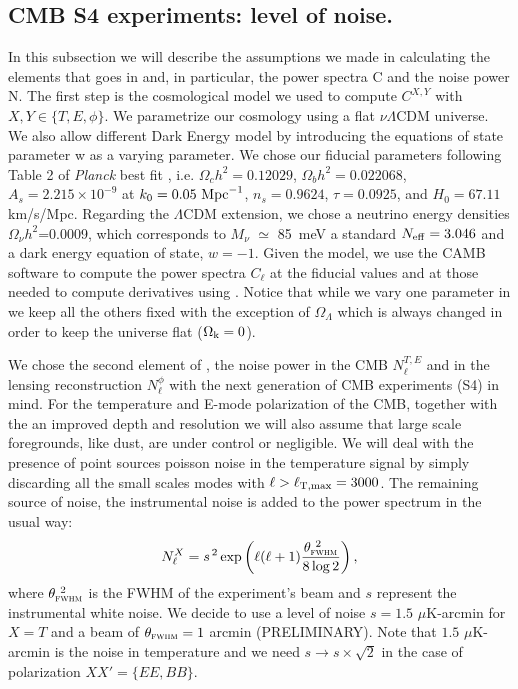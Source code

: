 \documentclass[aps,prd,preprint,groupedaddress]{revtex4-1}
\begin{document}
\subsection{CMB S4 experiments: level of noise.\label{subsec:cosmo-noise}}
In this subsection we will describe the assumptions we made in calculating the elements that goes in  and, in particular, the power spectra C and the noise power N.
The first step is the cosmological model we used to compute $C^{X,Y}$ with $X,Y \in \{T,E,\phi\}$.
We parametrize our cosmology using a flat $\nu \Lambda$CDM universe. We also allow different Dark Energy model by introducing the equations of state parameter w as a varying parameter.
We chose our fiducial parameters following Table 2 of \textit{Planck} best fit \cite{planck-collaboration:2014g}, i.e. $\Omega_c h^2 = 0.12029$, $\Omega_b h^2 = 0.022068$, $A_s = 2.215\times10^{-9}$ at $k_0 = 0.05\ {\rm Mpc}^{-1}$, $n_s = 0.9624$, $\tau = 0.0925$, and $H_0 = 67.11$ km/s/Mpc. Regarding the $\Lambda$CDM extension, we chose a neutrino energy densities $\Omega_{\nu} h^2$=0.0009, which corresponds to $M_{\nu}$ $\simeq$ 85\ meV a standard $N_{\rm eff}=3.046$ and a dark energy equation of state, $w=-1$.
Given the model, we use the CAMB software to compute the power spectra $C_{\ell}$ at the fiducial values and at those needed to compute derivatives using . Notice that while we vary one parameter in  we keep all the others fixed with the exception of $\Omega_{\Lambda}$ which is always changed in order to keep the universe flat ($\Omega_{\rm k} = 0$).

We chose the second element of , the noise power in the CMB $N_{\ell}^{T,E}$ and in the lensing reconstruction $N_{\ell}^{\phi}$ with the next generation of CMB experiments (S4) in mind.
For the temperature and E-mode polarization of the CMB, together with the an improved depth and resolution we will also assume that large scale foregrounds, like dust, are under control or negligible. We will deal with the presence of point sources poisson noise in the temperature signal by simply discarding all the small scales modes with $\ell>\ell_{\rm T,max}=3000$.
The remaining source of noise, the instrumental noise is added to the power spectrum in the usual way:
 \begin{equation}
 	\centering
		N^{X}_\ell = s^{\, 2} \exp \left(\ell(\ell+1) \frac{\theta^{\ 2}_{\textsc{fwhm}}}{8\log2}\right),
	\label{eq:beamnoise}
\end{equation}
where $\theta^{\ 2}_{\textsc{fwhm}}$ is the FWHM of the experiment's beam and $s$ represent the instrumental white noise.
We decide to use a level of noise $s = 1.5$ $\mu$K-arcmin for $X=T$ and a beam of $\theta_{\textsc{fwhm}}=1$ arcmin (PRELIMINARY).
Note that $1.5$ $\mu$K-arcmin is the noise in temperature and we need $s \rightarrow s\times \sqrt{2}$ in the case of polarization $ XX' = \{ EE, BB \}$.
\end{document}
